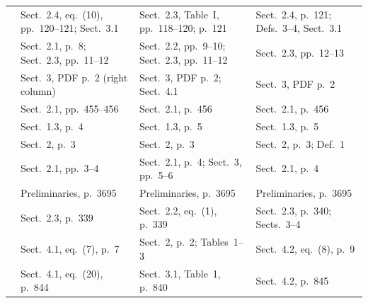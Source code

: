 {\begin{longtable}{@{}p{}p{}p{}p{}@{}}
            \cite{SchockaertJV12}       & Sect.~2.4, eq.~(10), pp.~120--121; Sect.~3.1          & Sect.~2.3, Table~I, pp.~118--120; p.~121        & Sect.~2.4, p.~121; Defs.~3--4, Sect.~3.1                           \\
            \cite{BlondeelSVD14}        & Sect.~2.1, p.~8; Sect.~2.3, pp.~11--12                & Sect.~2.2, pp.~9--10; Sect.~2.3, pp.~11--12     & Sect.~2.3, pp.~12--13                                              \\
            \cite{MushthofaSD14}        & Sect.~3, PDF p.~2 (right column)                      & Sect.~3, PDF p.~2; Sect.~4.1                    & Sect.~3, PDF p.~2                                                  \\
            \cite{MushthofaSD15}        & Sect.~2.1, pp.~455--456                               & Sect.~2.1, p.~456                               & Sect.~2.1, p.~456                                                  \\
            \cite{MushthofaSD20}        & Sect.~1.3, p.~4                                       & Sect.~1.3, p.~5                                 & Sect.~1.3, p.~5                                                    \\
            \cite{AlvianoP13}           & Sect.~2, p.~3                                         & Sect.~2, p.~3                                   & Sect.~2, p.~3; Def.~1                                              \\
            \cite{AlvianoP15}           & Sect.~2.1, pp.~3--4                                   & Sect.~2.1, p.~4; Sect.~3, pp.~5--6              & Sect.~2.1, p.~4                                                    \\
            \cite{AlvianoAP17}          & Preliminaries, p.~3695                                & Preliminaries, p.~3695                          & Preliminaries, p.~3695                                             \\
            \cite{Lukasiewicz01}        & Sect.~2.3, p.~339                                     & Sect.~2.2, eq.~(1), p.~339                      & Sect.~2.3, p.~340; Sects.~3--4                                     \\
            \cite{LukasiewiczS07}       & Sect.~4.1, eq.~(7), p.~7                              & Sect.~2, p.~2; Tables~1--3                      & Sect.~4.2, eq.~(8), p.~9                                           \\
            \cite{LukasiewiczS09}       & Sect.~4.1, eq.~(20), p.~844                           & Sect.~3.1, Table~1, p.~840                      & Sect.~4.2, p.~845                                                  \\

\end{longtable}}
